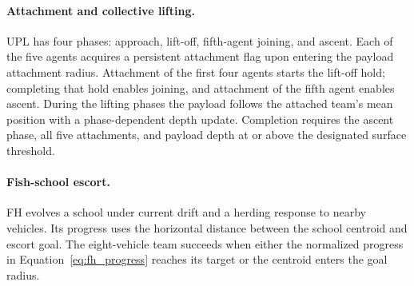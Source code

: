 \paragraph{Attachment and collective lifting.}
UPL has four phases: approach, lift-off, fifth-agent joining, and ascent. Each of the five agents acquires a persistent attachment flag upon entering the payload attachment radius. Attachment of the first four agents starts the lift-off hold; completing that hold enables joining, and attachment of the fifth agent enables ascent. During the lifting phases the payload follows the attached team's mean position with a phase-dependent depth update. Completion requires the ascent phase, all five attachments, and payload depth at or above the designated surface threshold.

\paragraph{Fish-school escort.}
FH evolves a school under current drift and a herding response to nearby vehicles. Its progress uses the horizontal distance between the school centroid and escort goal. The eight-vehicle team succeeds when either the normalized progress in Equation~\ref{eq:fh_progress} reaches its target or the centroid enters the goal radius.

